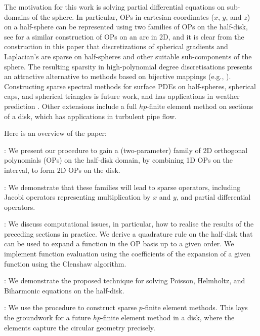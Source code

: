 \documentclass[11pt, oneside]{article}   	%
\begin{document}
The motivation for this work is solving partial differential equations on sub-domains of the sphere. In particular, OPs in cartesian coordinates ($x$, $y$, and $z$) on a half-sphere  can be represented using two families of OPs on the half-disk, see \cite[Theorem 3.1]{olver2018orthogonal} for a similar construction of OPs on an arc in 2D, and it is clear from the construction in this paper that discretizations of spherical gradients and Laplacian's are sparse on half-spheres and other suitable sub-components of the sphere. The resulting sparsity in high-polynomial degree discretisations presents an attractive alternative to methods based on bijective mappings (e.g., \cite{DGShallowWater,FEMShallowWater,boyd2005sphere}).
%
Constructing sparse spectral methods for surface PDEs on half-spheres, spherical caps, and spherical triangles is future work, and has applications in weather prediction \cite{staniforth2012horizontal}. Other extensions include a full $hp$-finite element method on sections of a disk, which has applications in turbulent pipe flow.

Here is an overview of the paper:  

\noindent {}: We present our procedure  to gain a (two-parameter) family of 2D orthogonal polynomials (OPs) on the half-disk domain, by combining 1D OPs on the interval, to form 2D OPs on the disk. 

\noindent{}: We demonstrate that these families will lead to sparse operators, including Jacobi operators representing multiplication by $x$ and $y$, and partial differential operators.

\noindent{}: We discuss computational issues, in particular, how to realise the results of the preceding sections in practice.  We  derive a quadrature rule on the half-disk that can be used to expand a function in the OP basis up to a given order.  We implement function evaluation using the coefficients of the expansion of a given function using the Clenshaw algorithm.

\noindent{}: We demonstrate the proposed technique for solving Poisson, Helmholtz, and Biharmonic equations on the half-disk.  

\noindent{}: We use the procedure to construct sparse $p$-finite element methods. This lays the groundwork for a future $hp$-finite element method in a disk, where the elements capture the circular geometry precisely.
\end{document}

